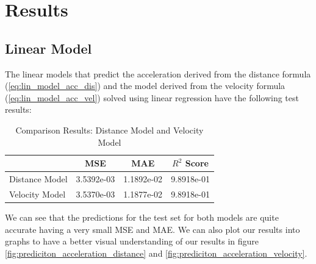 \section{Results}

\subsection{Linear Model}

The linear models that predict the acceleration derived from the distance formula
(\ref{eq:lin_model_acc_dis}) and the model derived from the velocity formula (\ref{eq:lin_model_acc_vel}) solved using linear regression have the following test results:


\begin{table}[h]
\centering
\caption{Comparison Results: Distance Model and Velocity Model}
\label{tab:model_comparison}
\begin{tabular}{l S[table-format=1.4e-2] S[table-format=1.4e-2] S[table-format=1.4e-2]}
\toprule
 & {MSE} & {MAE} & {$R^2$ Score} \\
\midrule
Distance Model & 3.5392e-03 & 1.1892e-02 & 9.8918e-01 \\
Velocity Model & 3.5370e-03 & 1.1877e-02 & 9.8918e-01 \\
\bottomrule
\end{tabular}
\end{table}

We can see that the predictions for the test set for both models are quite accurate having a very small MSE and MAE. 
We can also plot our results into graphs to have a better visual understanding of our results 
in figure \ref{fig:prediciton_acceleration_distance} and \ref{fig:prediciton_acceleration_velocity}.

